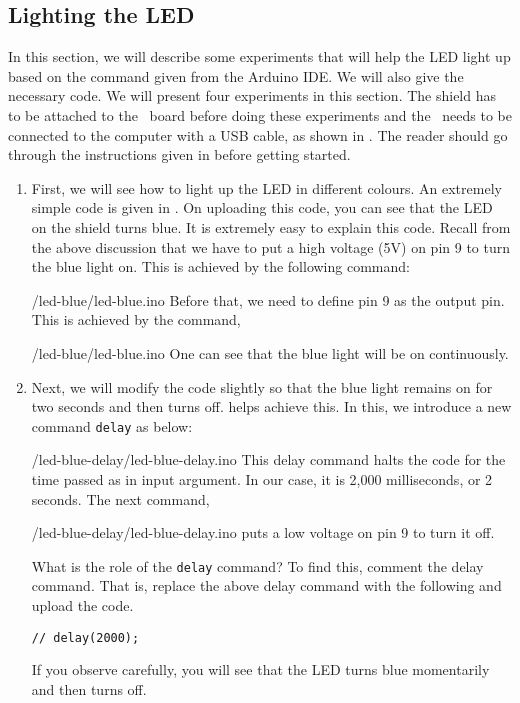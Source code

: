 \subsection{Lighting the LED}
\label{sec:light-ard}
In this section, we will describe some experiments that will help the
LED light up based on the command given from the Arduino IDE.  We will
also give the necessary code.  We will present four experiments in
this section.  The shield has to be attached to the \arduino\ board
before doing these experiments and the \arduino\ needs to be connected to the computer 
with a USB cable, as shown in . The reader should go through the
instructions given in  before getting started.
\begin{enumerate}
  \item First, we will see how to light up the LED in different
        colours.  An extremely simple code is given in .
        On uploading this code, you can see that the LED on the shield turns
        blue.  It is extremely easy to explain this code.  Recall from the
        above discussion that we have to put a high voltage (5V) on pin 9 to
        turn the blue light on.  This is achieved by the following command:
        
        {\LocLEDardcode/led-blue/led-blue.ino}
        Before that, we need to define pin 9 as the
        output pin.  This is achieved by the command,
        
        {\LocLEDardcode/led-blue/led-blue.ino}
        One can see that the blue light will be on continuously.  
        
  \item Next, we will modify the code slightly so that the blue light
        remains on for two seconds and then turns off.
         helps achieve this.  In this, we
        introduce a new command {\tt delay} as below:
        
        {\LocLEDardcode/led-blue-delay/led-blue-delay.ino} This delay
        command halts the code for the time passed as in input argument. In
        our case, it is 2,000 milliseconds, or 2 seconds.  The next command,
        
        {\LocLEDardcode/led-blue-delay/led-blue-delay.ino} puts a low
        voltage on pin 9 to turn it off.
        
        What is the role of the {\tt delay} command?  To find this,
        comment the delay command.  That is, replace the above delay command
        with the following and upload the code.
        \begin{lstlisting}[style=nonumbers]
    // delay(2000);
  \end{lstlisting}
        If you observe carefully, you will see that the LED turns blue
        momentarily and then turns off.
        

\end{enumerate}
